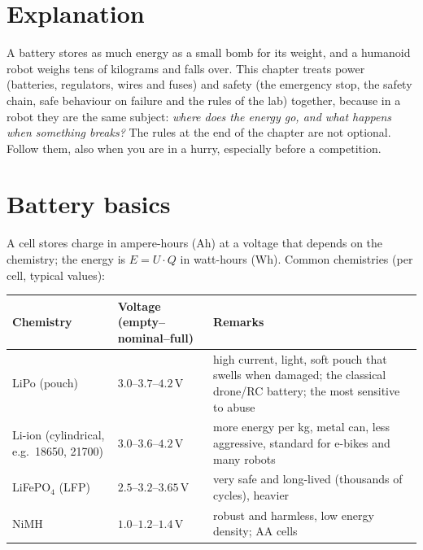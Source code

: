 \label{ch:hw8}

\section*{Explanation}
A battery stores as much energy as a small bomb for its weight, and a humanoid robot weighs tens of kilograms and falls over. This chapter treats power (batteries, regulators, wires and fuses) and safety (the emergency stop, the safety chain, safe behaviour on failure and the rules of the lab) together, because in a robot they are the same subject: \emph{where does the energy go, and what happens when something breaks?} The rules at the end of the chapter are not optional. Follow them, also when you are in a hurry, especially before a competition.

\section*{Battery basics}
A cell stores charge in ampere-hours (Ah) at a voltage that depends on the chemistry; the energy is $E=U\cdot Q$ in watt-hours (Wh). Common chemistries (per cell, typical values):
\begin{center}
\renewcommand{\arraystretch}{1.25}
\begin{tabular}{p{3.0cm}p{2.9cm}p{6.8cm}}
\textbf{Chemistry} & \textbf{Voltage (empty--nominal--full)} & \textbf{Remarks}\\ \hline
LiPo (pouch) & $3.0$--$3.7$--$4.2$\,V & high current, light, soft pouch that swells when damaged; the classical drone/RC battery; the most sensitive to abuse\\
Li-ion (cylindrical, e.g.\ 18650, 21700) & $3.0$--$3.6$--$4.2$\,V & more energy per kg, metal can, less aggressive, standard for e-bikes and many robots\\
LiFePO$_4$ (LFP) & $2.5$--$3.2$--$3.65$\,V & very safe and long-lived (thousands of cycles), heavier\\
NiMH & $1.0$--$1.2$--$1.4$\,V & robust and harmless, low energy density; AA cells\\
\end{tabular}
\end{center}
